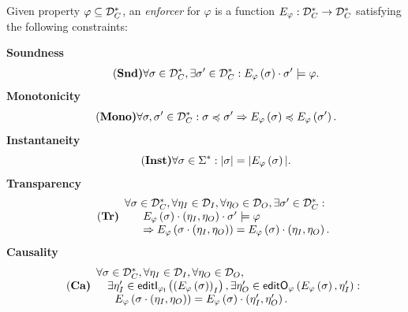 \begin{definition}
	\label{def-E-func-constraints}
	Given property $\varphi\subseteq{\mathcal D}_C^*$, an {\em enforcer} for $\varphi$ is a function $E_{\varphi}: {\mathcal D}_C^*\rightarrow {\mathcal D}_C^*$ satisfying the following constraints:
	
	{\bf Soundness}
	\begin{equation}
	\tag{\bf Snd}\label{eq:snd}
	\forall \sigma \in {\mathcal D}_C^*, \exists \sigma' \in {\mathcal D}_C^*:  E_{\varphi}\left(\sigma\right)\cdot \sigma' \models \varphi.
	\end{equation}
	{\bf Monotonicity}
	\begin{equation}
	\tag{\bf Mono}\label{eq:mono}
	\forall \sigma, \sigma' \in {\mathcal D}_C^*: \sigma\preccurlyeq \sigma' \Rightarrow E_{\varphi}\left(\sigma\right) \preccurlyeq E_{\varphi}\left(\sigma'\right).
	\end{equation}
	{\bf Instantaneity}
	\begin{equation}
	\tag{\bf Inst}\label{eq:inst}
	\forall \sigma \in \Sigma^*: |\sigma| =  |E_{\varphi}\left(\sigma\right)|.
	\end{equation}
	{\bf Transparency}
	\begin{equation}
	\tag{\bf Tr}\label{eq:tr}
	\begin{array}{ll}
	\forall \sigma\in {\mathcal D}_C^*, \forall \eta_I \in {\mathcal D}_I, \forall \eta_O \in {\mathcal D}_O, \exists \sigma' \in {\mathcal D}_C^*:\\
	~~~~~E_{\varphi}\left(\sigma\right)\cdot\left(\eta_I, \eta_O\right) \cdot \sigma' \models \varphi\\
	~~~~~ \Rightarrow E_{\varphi}\left(\sigma\cdot\left(\eta_I, \eta_O\right) \right) = E_{\varphi}\left(\sigma\right)\cdot\left(\eta_I, \eta_O\right) .
	\end{array}
	\end{equation}
	{\bf Causality}
	\begin{equation}
	\tag{\bf Ca}\label{eq:ca}
	\begin{array}{ll}
	\forall \sigma \in {\mathcal D}_C^*, \forall \eta_I \in {\mathcal D}_I,\forall \eta_O \in {\mathcal D}_O,\\
	~~~\exists \eta_I' \in \mathsf{editI_{\varphi_I}}\left(\left(E_{\varphi}\left(\sigma\right)\right)_I\right), \exists \eta_O' \in \mathsf{editO_{\varphi}}\left(E_{\varphi}\left(\sigma\right), \eta_I'\right):\\
	~~~~~E_{\varphi}\left(\sigma\cdot\left(\eta_I,\eta_O\right)\right)= E_{\varphi}\left(\sigma\right)\cdot\left(\eta_I',\eta_O'\right).
	\end{array}
	\end{equation}
\end{definition}


